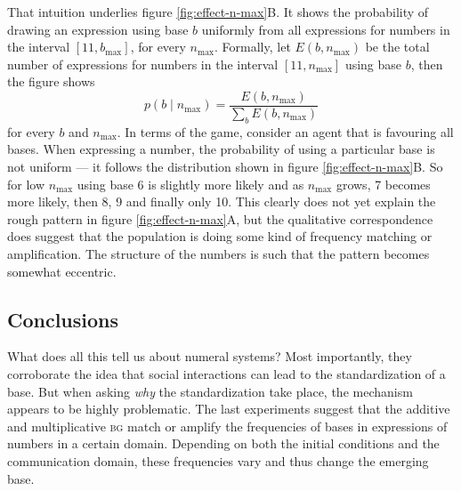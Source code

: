 \documentclass{../src/bcthesispart}
\begin{document}
That intuition underlies figure \ref{fig:effect-n-max}B.
It shows the probability of drawing an expression using base $b$ uniformly from all expressions for numbers in the interval $[11, b_{\text{max}}]$, for every $n_{\text{max}}$. Formally, let $E(b, n_{\text{max}})$ be the total number of expressions for numbers in the interval $[11, n_{\text{max}}]$ using base $b$, then the figure shows 
	\[ 
		p(b \mid n_{\text{max}}) = \frac{E(b, n_{\text{max}})}{\sum_b E(b, n_{\text{max}})}
	\] 
	for every $b$ and $n_{\text{max}}$.
In terms of the game, consider an agent that is favouring all bases.
When expressing a number, the probability of using a particular base is not uniform — it follows the distribution shown in figure \ref{fig:effect-n-max}B.
So for low $n_{\text{max}}$ using base 6 is slightly more likely and as $n_{\text{max}}$ grows, 7 becomes more likely, then 8, 9 and finally only 10.
This clearly does not yet explain the rough pattern in figure \ref{fig:effect-n-max}A, but the qualitative correspondence does suggest that the population is doing some kind of frequency matching or amplification.
The structure of the numbers is such that the pattern becomes somewhat eccentric.





\subsection{Conclusions}
What does all this tell us about numeral systems?
Most importantly, they corroborate the idea that social interactions can lead to the standardization of a base.
But when asking \emph{why} the standardization take place, the mechanism appears to be highly problematic.
The last experiments suggest that the additive and multiplicative \textsc{bg} match or amplify the frequencies of bases in expressions of numbers in a certain domain.
Depending on both the initial conditions and the communication domain, these frequencies vary and thus change the emerging base.
\end{document}
